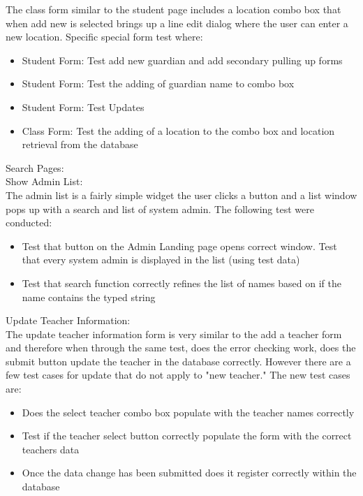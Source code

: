 The class form similar to the student page includes a location combo box that when add new is selected brings up a line edit dialog where the user can enter a new location. Specific special form test where:

\begin{itemize}
\item Student Form: Test add new guardian and add secondary pulling up forms
\item Student Form: Test the adding of guardian name to combo box
\item Student Form: Test Updates
\item Class Form: Test the adding of a location to the combo box and location retrieval from the database
\end{itemize}

Search Pages:\\

Show Admin List:\\
The admin list is a fairly simple widget the user clicks a button and a list window pops up with a search and list of system admin. The following test were conducted:

\begin{itemize}
\item Test that button on the Admin Landing page opens correct window.
\itme Test that every system admin is displayed in the list (using test data)
\item Test that search function correctly refines the list of names based on if the name contains the typed string
\end{itemize}

Update Teacher Information:\\
The update teacher information form is very similar to the add a teacher form and therefore when through the same test, does the error checking work, does the submit button update the teacher in the database correctly. However there are a few test cases for update that do not apply to "new teacher." The new test cases are:

\begin{itemize}
\item Does the select teacher combo box populate with the teacher names correctly
\item Test if the teacher select button correctly populate the form with the correct teachers data
\item Once the data change has been submitted does it register correctly within the database
\end{itemize}

